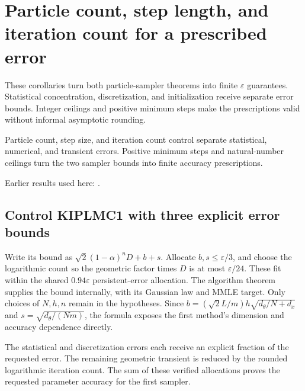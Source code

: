 \documentclass[11pt,a4paper]{report}
\begin{document}
\section{\texorpdfstring{Particle count, step length, and iteration count for a prescribed error}{Particle count, step length, and iteration count for a prescribed error}}
\label{proof-module-KIPLMC-Accuracy-lean}


These corollaries turn both particle-sampler theorems into finite \(\varepsilon\) guarantees. Statistical concentration, discretization, and initialization receive separate error bounds. Integer ceilings and positive minimum steps make the prescriptions valid without informal asymptotic rounding.



Particle count, step size, and iteration count control separate statistical, numerical, and transient errors. Positive minimum steps and natural-number ceilings turn the two sampler bounds into finite accuracy prescriptions.



Earlier results used here: \cite[Section~3.99]{LangevinLean2026Kinetic}.
\subsection{\texorpdfstring{Control KIPLMC1 with three explicit error bounds}{Control KIPLMC1 with three explicit error bounds}}
\label{report-step-KIPLMC-Accuracy-lean-1}


Write its bound as \(\sqrt2(1-\alpha)^nD+b+s\). Allocate \(b,s\le\varepsilon/3\), and choose the logarithmic count so the geometric factor times \(D\) is at most \(\varepsilon/24\). These fit within the shared \(0.94\varepsilon\) persistent-error allocation. The algorithm theorem supplies the bound internally, with its Gaussian law and MMLE target. Only choices of \(N,h,n\) remain in the hypotheses. Since \(b=(\sqrt2 L/m)h\sqrt{d_\theta/N+d_x}\) and \(s=\sqrt{d_\theta/(Nm)}\), the formula exposes the first method’s dimension and accuracy dependence directly.



The statistical and discretization errors each receive an explicit fraction of the requested error. The remaining geometric transient is reduced by the rounded logarithmic iteration count. The sum of these verified allocations proves the requested parameter accuracy for the first sampler.
\end{document}
